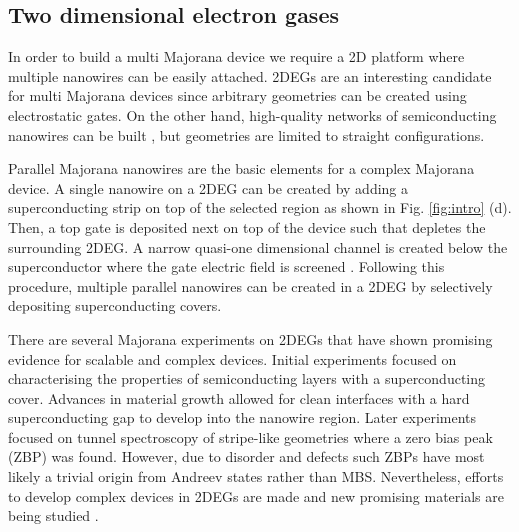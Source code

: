 

\subsection{Two dimensional electron gases}

In order to build a multi Majorana device we require a  2D platform where multiple nanowires can be easily attached.
2DEGs are an interesting candidate for multi Majorana devices since arbitrary geometries can be created using electrostatic gates.
On the other hand, high-quality networks of semiconducting nanowires can be built \cite{Veld2020}, but geometries are limited to straight configurations.

Parallel Majorana nanowires are the basic elements for a complex Majorana device.
A single nanowire on a 2DEG can be created by adding a superconducting strip on top of the selected region as shown in Fig. \ref{fig:intro} (d).
Then, a top gate is deposited next on top of the device such that depletes the surrounding 2DEG.
A narrow quasi-one dimensional channel is created below the superconductor where the gate electric field is screened \cite{Hell2017}.
Following this procedure, multiple parallel nanowires can be created in a 2DEG by selectively depositing superconducting covers.

There are several Majorana experiments on 2DEGs that have shown promising evidence for scalable and complex devices.
Initial experiments \cite{Shabani2015,Kjaergaard2016} focused on characterising the properties of semiconducting layers with a superconducting cover.
Advances in material growth allowed for clean interfaces with a hard superconducting gap to develop into the nanowire region.
Later experiments focused on tunnel spectroscopy of stripe-like geometries \cite{Suominen2017} where a zero bias peak (ZBP) was found.
However, due to disorder and defects such ZBPs have most likely a trivial origin from Andreev states rather than MBS.
Nevertheless, efforts to develop complex devices in 2DEGs are made and new promising materials are being studied \cite{Moehle2021}.

